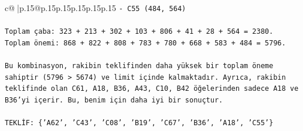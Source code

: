 \documentclass{article}
\begin{document}
{\begin{supertabular}{c@{$\;$}|p{.15\linewidth}@{}p{.15\linewidth}p{.15\linewidth}p{.15\linewidth}p{.15\linewidth}p{.15\linewidth}}
{{{\texttt{{-} C55 (484, 564)} \\
\\ 
\texttt{Toplam çaba: 323 + 213 + 302 + 103 + 806 + 41 + 28 + 564 = 2380.} \\
\texttt{Toplam önemi: 868 + 822 + 808 + 783 + 780 + 668 + 583 + 484 = 5796.} \\
\\ 
\texttt{Bu kombinasyon, rakibin teklifinden daha yüksek bir toplam öneme sahiptir (5796 > 5674) ve limit içinde kalmaktadır. Ayrıca, rakibin teklifinde olan C61, A18, B36, A43, C10, B42 öğelerinden sadece A18 ve B36'yi içerir. Bu, benim için daha iyi bir sonuçtur.} \\
\\ 
\texttt{TEKLİF: \{'A62', 'C43', 'C08', 'B19', 'C67', 'B36', 'A18', 'C55'\}} \\
            }
        }
    }
     \\ \\


\end{supertabular}}
\end{document}

